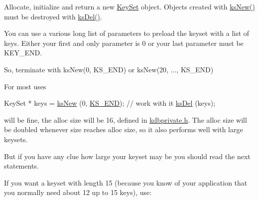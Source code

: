 Allocate, initialize and return a new \hyperlink{classkdb_1_1KeySet}{Key\+Set} object. Objects created with \hyperlink{group__keyset_ga671e1aaee3ae9dc13b4834a4ddbd2c3c}{ks\+New()} must be destroyed with \hyperlink{group__keyset_ga27e5c16473b02a422238c8d970db7ac8}{ks\+Del()}.

You can use a various long list of parameters to preload the keyset with a list of keys. Either your first and only parameter is 0 or your last parameter must be K\+E\+Y\+\_\+\+E\+ND.

So, terminate with ks\+New(0, K\+S\+\_\+\+E\+N\+D) or ks\+New(20, ..., K\+S\+\_\+\+E\+ND)

For most uses


\begin{DoxyCodeInclude}
KeySet * keys = \hyperlink{group__keyset_ga671e1aaee3ae9dc13b4834a4ddbd2c3c}{ksNew} (0, \hyperlink{kdbenum_8c_a7a28fce3773b2c873c94ac80b8b4cd54}{KS\_END});
\textcolor{comment}{// work with it}
\hyperlink{group__keyset_ga27e5c16473b02a422238c8d970db7ac8}{ksDel} (keys);
\end{DoxyCodeInclude}
 will be fine, the alloc size will be 16, defined in \hyperlink{kdbprivate_8h}{kdbprivate.\+h}. The alloc size will be doubled whenever size reaches alloc size, so it also performs well with large keysets.

But if you have any clue how large your keyset may be you should read the next statements.

If you want a keyset with length 15 (because you know of your application that you normally need about 12 up to 15 keys), use\+:


